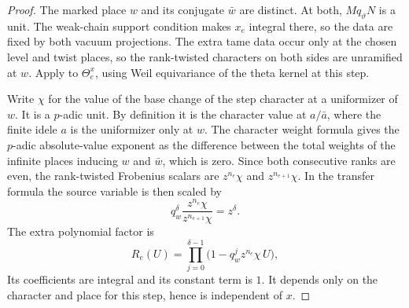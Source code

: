 \begin{proof}
The marked place $w$ and its conjugate $\bar w$ are distinct. At both, $Mq_\vartheta N$ is a unit. The weak-chain support condition makes $x_e$ integral there, so the data are fixed by both vacuum projections. The extra tame data occur only at the chosen level and twist places, so the rank-twisted characters on both sides are unramified at $w$. Apply  to $\Theta_e^x$, using Weil equivariance of the theta kernel at this step.

Write $\chi$ for the value of the base change of the step character at a uniformizer of $w$. It is a $p$-adic unit. By definition it is the character value at $a/\bar a$, where the finite idele $a$ is the uniformizer only at $w$. The character weight formula gives the $p$-adic absolute-value exponent as the difference between the total weights of the infinite places inducing $w$ and $\bar w$, which is zero. Since both consecutive ranks are even, the rank-twisted Frobenius scalars are $z^{n_e}\chi$ and $z^{n_{e+1}}\chi$. In the transfer formula the source variable is then scaled by
\[
 q_w^\delta\frac{z^{n_e}\chi}{z^{n_{e+1}}\chi}=z^\delta.
\]
The extra polynomial factor is
\[
 R_e(U)=\prod_{j=0}^{\delta-1}\bigl(1-q_w^jz^{n_e}\chi\,U\bigr),
\]
Its coefficients are integral and its constant term is $1$. It depends only on the character and place for this step, hence is independent of $x$.
\end{proof}

